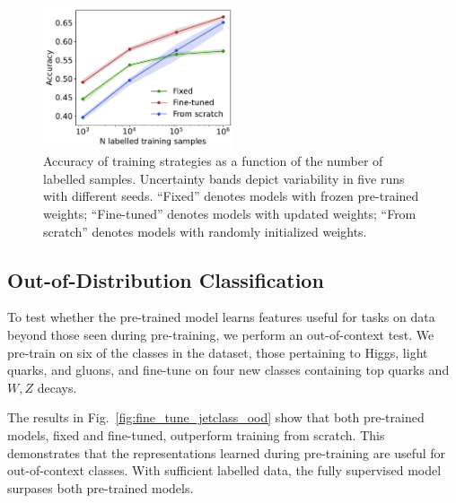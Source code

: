 \begin{figure}[tp!]
    \centering
    \includegraphics[width=0.5\textwidth]{Figures/foundation_models/mpm1/jc_corrected_pt_40_accuracy.pdf}
    \caption{
        Accuracy of training strategies as a function of the number of labelled samples. Uncertainty bands depict variability in five runs with different seeds.
        ``Fixed'' denotes models with frozen pre-trained weights; ``Fine-tuned'' denotes models with updated weights; ``From scratch'' denotes models with randomly initialized weights.
    }
    \label{fig:fine_tune_jetclass}
\end{figure}

\subsection{Out-of-Distribution Classification}

To test whether the pre-trained model learns features useful for tasks on data beyond those seen during pre-training, we perform an out-of-context test.
We pre-train on six of the classes in the dataset, those pertaining to Higgs, light quarks, and gluons, and fine-tune on four new classes containing top quarks and $W, Z$ decays.

The results in Fig.~\ref{fig:fine_tune_jetclass_ood} show that both pre-trained models, fixed and fine-tuned, outperform training from scratch.
This demonstrates that the representations learned during pre-training are useful for out-of-context classes.
With sufficient labelled data, the fully supervised model surpases both pre-trained models.

